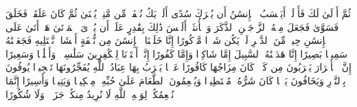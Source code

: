 ثُمَّ أَوۡلَىٰ لَكَ فَأَوۡلَىٰۤ%
\stopbuffer%
\startbuffer[\q:75:36]
أَیَحۡسَبُ ٱلۡإِنسَٰنُ أَن یُتۡرَكَ سُدًى%
\stopbuffer%
\startbuffer[\q:75:37]
أَلَمۡ یَكُ نُطۡفَةࣰ مِّن مَّنِیࣲّ یُمۡنَىٰ%
\stopbuffer%
\startbuffer[\q:75:38]
ثُمَّ كَانَ عَلَقَةࣰ فَخَلَقَ فَسَوَّىٰ%
\stopbuffer%
\startbuffer[\q:75:39]
فَجَعَلَ مِنۡهُ ٱلزَّوۡجَیۡنِ ٱلذَّكَرَ وَٱلۡأُنثَىٰۤ%
\stopbuffer%
\startbuffer[\q:75:40]
أَلَیۡسَ ذَٰلِكَ بِقَٰدِرٍ عَلَىٰۤ أَن یُحۡۦِیَ ٱلۡمَوۡتَىٰ%
\stopbuffer%
\startbuffer[\q:76:1]
هَلۡ أَتَىٰ عَلَى ٱلۡإِنسَٰنِ حِینࣱ مِّنَ ٱلدَّهۡرِ لَمۡ یَكُن شَیۡءࣰا مَّذۡكُورًا%
\stopbuffer%
\startbuffer[\q:76:2]
إِنَّا خَلَقۡنَا ٱلۡإِنسَٰنَ مِن نُّطۡفَةٍ أَمۡشَاجࣲ نَّبۡتَلِیهِ فَجَعَلۡنَٰهُ سَمِیعَۢا بَصِیرًا%
\stopbuffer%
\startbuffer[\q:76:3]
إِنَّا هَدَیۡنَٰهُ ٱلسَّبِیلَ إِمَّا شَاكِرࣰا وَإِمَّا كَفُورًا%
\stopbuffer%
\startbuffer[\q:76:4]
إِنَّاۤ أَعۡتَدۡنَا لِلۡكَٰفِرِینَ سَلَٰسِلَا۟ وَأَغۡلَٰلࣰا وَسَعِیرًا%
\stopbuffer%
\startbuffer[\q:76:5]
إِنَّ ٱلۡأَبۡرَارَ یَشۡرَبُونَ مِن كَأۡسࣲ كَانَ مِزَاجُهَا كَافُورًا%
\stopbuffer%
\startbuffer[\q:76:6]
عَیۡنࣰا یَشۡرَبُ بِهَا عِبَادُ ٱللَّهِ یُفَجِّرُونَهَا تَفۡجِیرࣰا%
\stopbuffer%
\startbuffer[\q:76:7]
یُوفُونَ بِٱلنَّذۡرِ وَیَخَافُونَ یَوۡمࣰا كَانَ شَرُّهُۥ مُسۡتَطِیرࣰا%
\stopbuffer%
\startbuffer[\q:76:8]
وَیُطۡعِمُونَ ٱلطَّعَامَ عَلَىٰ حُبِّهِۦ مِسۡكِینࣰا وَیَتِیمࣰا وَأَسِیرًا%
\stopbuffer%
\startbuffer[\q:76:9]
إِنَّمَا نُطۡعِمُكُمۡ لِوَجۡهِ ٱللَّهِ لَا نُرِیدُ مِنكُمۡ جَزَاۤءࣰ وَلَا شُكُورًا%
\stopbuffer%
